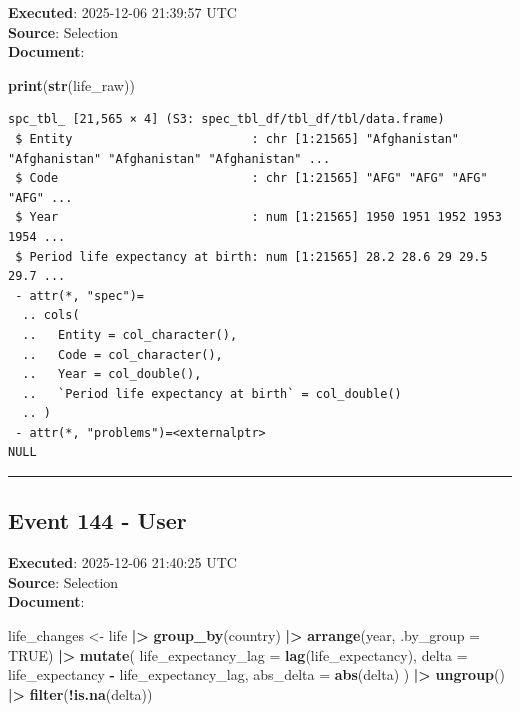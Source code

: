 \documentclass[
  11pt,
]{article}
\newenvironment{Shaded}{\begin{snugshade}}{\end{snugshade}}
\newcommand{\AttributeTok}[1]{\textcolor[rgb]{0.13,0.29,0.53}{#1}}
\newcommand{\ConstantTok}[1]{\textcolor[rgb]{0.56,0.35,0.01}{#1}}
\newcommand{\FunctionTok}[1]{\textcolor[rgb]{0.13,0.29,0.53}{\textbf{#1}}}
\newcommand{\NormalTok}[1]{#1}
\newcommand{\OtherTok}[1]{\textcolor[rgb]{0.56,0.35,0.01}{#1}}
\newcommand{\SpecialCharTok}[1]{\textcolor[rgb]{0.81,0.36,0.00}{\textbf{#1}}}
\newenvironment{rpoutput}{\vspace{0.5em}\begin{snugshade}}{\end{snugshade}}
\begin{document}
\textbf{Executed}: 2025-12-06 21:39:57 UTC\\
\textbf{Source}: Selection\\
\textbf{Document}:

\begin{Shaded}
\begin{Highlighting}[]
\FunctionTok{print}\NormalTok{(}\FunctionTok{str}\NormalTok{(life\_raw))}
\end{Highlighting}
\end{Shaded}

\begin{rpoutput}

\begin{verbatim}
spc_tbl_ [21,565 × 4] (S3: spec_tbl_df/tbl_df/tbl/data.frame)
 $ Entity                         : chr [1:21565] "Afghanistan" "Afghanistan" "Afghanistan" "Afghanistan" ...
 $ Code                           : chr [1:21565] "AFG" "AFG" "AFG" "AFG" ...
 $ Year                           : num [1:21565] 1950 1951 1952 1953 1954 ...
 $ Period life expectancy at birth: num [1:21565] 28.2 28.6 29 29.5 29.7 ...
 - attr(*, "spec")=
  .. cols(
  ..   Entity = col_character(),
  ..   Code = col_character(),
  ..   Year = col_double(),
  ..   `Period life expectancy at birth` = col_double()
  .. )
 - attr(*, "problems")=<externalptr> 
NULL
\end{verbatim}

\end{rpoutput}

\begin{center}\rule{0.5\linewidth}{0.5pt}\end{center}

\subsection{Event 144 - User}\label{event-144---user}

\textbf{Executed}: 2025-12-06 21:40:25 UTC\\
\textbf{Source}: Selection\\
\textbf{Document}:

\begin{Shaded}
\begin{Highlighting}[]
\NormalTok{life\_changes }\OtherTok{\textless{}{-}}\NormalTok{ life }\SpecialCharTok{|\textgreater{}}
  \FunctionTok{group\_by}\NormalTok{(country) }\SpecialCharTok{|\textgreater{}}
  \FunctionTok{arrange}\NormalTok{(year, }\AttributeTok{.by\_group =} \ConstantTok{TRUE}\NormalTok{) }\SpecialCharTok{|\textgreater{}}
  \FunctionTok{mutate}\NormalTok{(}
    \AttributeTok{life\_expectancy\_lag =} \FunctionTok{lag}\NormalTok{(life\_expectancy),}
    \AttributeTok{delta =}\NormalTok{ life\_expectancy }\SpecialCharTok{{-}}\NormalTok{ life\_expectancy\_lag,}
    \AttributeTok{abs\_delta =} \FunctionTok{abs}\NormalTok{(delta)}
\NormalTok{  ) }\SpecialCharTok{|\textgreater{}}
  \FunctionTok{ungroup}\NormalTok{() }\SpecialCharTok{|\textgreater{}}
  \FunctionTok{filter}\NormalTok{(}\SpecialCharTok{!}\FunctionTok{is.na}\NormalTok{(delta))}
\end{Highlighting}
\end{Shaded}
\end{document}
